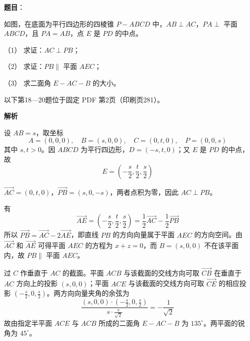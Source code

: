 \begin{answer}

\textbf{题目}：

如图，在底面为平行四边形的四棱锥 $P-ABCD$ 中，$AB\perp AC$，$PA\perp$ 平面 $ABCD$，且 $PA=AB$，点 $E$ 是 $PD$ 的中点。

（1） 求证：$AC\perp PB$；

（2） 求证：$PB\parallel$ 平面 $AEC$；

（3） 求二面角 $E-AC-B$ 的大小。
\nopagebreak[4]
\begin{center}\end{center}
\nopagebreak[4]
\begin{gktip}
以下第18—20题位于固定 PDF 第2页（印刷页281）。
\end{gktip}

\textbf{解析}

设 $AB=s$，取坐标
\nopagebreak[4]
\[
A=(0,0,0),\quad B=(s,0,0),\quad C=(0,t,0),\quad P=(0,0,s)
\]
其中 $s,t>0$。因 $ABCD$ 为平行四边形，$D=(-s,t,0)$；又 $E$ 是 $PD$ 的中点，故
\nopagebreak[4]
\[
E=\left(-\frac s2,\frac t2,\frac s2\right)
\]


$\overrightarrow{AC}=(0,t,0)$，$\overrightarrow{PB}=(s,0,-s)$，两者点积为零，因此 $AC\perp PB$。


有
\nopagebreak[4]
\[
\overrightarrow{AE}=\left(-\frac s2,\frac t2,\frac s2\right)
=\frac12\overrightarrow{AC}-\frac12\overrightarrow{PB}
\]
所以 $\overrightarrow{PB}=\overrightarrow{AC}-2\overrightarrow{AE}$，即直线 $PB$ 的方向向量属于平面 $AEC$ 的方向空间。由 $\overrightarrow{AC}$ 和 $\overrightarrow{AE}$ 可得平面 $AEC$ 的方程为 $x+z=0$，而 $B=(s,0,0)$ 不在该平面内，故 $PB\parallel$ 平面 $AEC$。


过 $C$ 作垂直于 $AC$ 的截面。平面 $ACB$ 与该截面的交线方向可取 $\overrightarrow{CB}$ 在垂直于 $AC$ 方向上的投影 $(s,0,0)$；平面 $ACE$ 与该截面的交线方向可取 $\overrightarrow{CE}$ 的相应投影 $(-\frac s2,0,\frac s2)$。两方向向量夹角的余弦为
\nopagebreak[4]
\[
\frac{(s,0,0)\cdot(-\frac s2,0,\frac s2)}{s\cdot\frac{s}{\sqrt2}}
=-\frac1{\sqrt2}
\]
故由指定半平面 $ACE$ 与 $ACB$ 所成的二面角 $E-AC-B$ 为 $135^\circ$。两平面的锐角为 $45^\circ$。




\end{answer}

